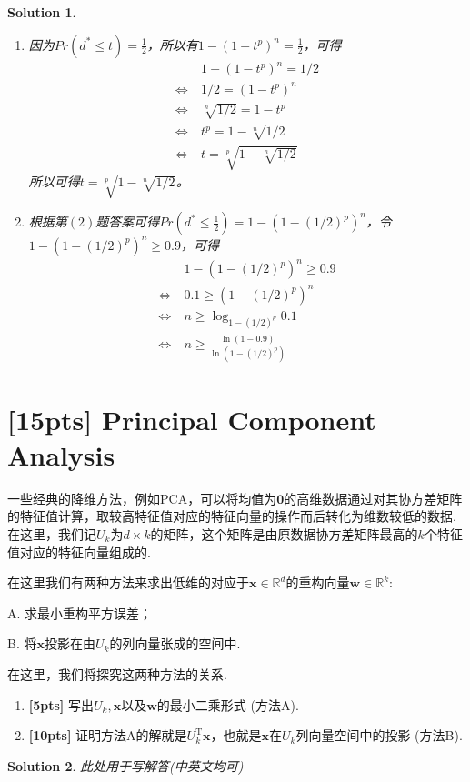 \documentclass[a4paper,UTF8]{article}
\numberwithin{equation}{section}
\newtheorem*{mySol}{Solution}
\begin{document}
\begin{mySol}
\begin{enumerate}[(1)]
\item 
因为$Pr(d^*\leq t)=\frac{1}{2}$，所以有$1 - (1-t^p)^n = \frac{1}{2}$，可得
\begin{equation}
\begin{aligned}
&1 - (1-t^p)^n = 1/2\\
\Leftrightarrow\ &1/2 = (1-t^p)^n\\
\Leftrightarrow\ &\sqrt[n]{1/2} = 1-t^p\\
\Leftrightarrow\ &t^p = 1- \sqrt[n]{1/2}\\
\Leftrightarrow\ &t = \sqrt[p]{1- \sqrt[n]{1/2}}
\end{aligned}
\end{equation}
所以可得$t = \sqrt[p]{1- \sqrt[n]{1/2}}$。
\item 
根据第$(2)$题答案可得$Pr(d^* \leq \frac{1}{2}) = 1 - (1-(1/2)^p)^n$，令$1 - (1-(1/2)^p)^n \geq 0.9$，可得
\begin{equation}
\begin{aligned}
&1 - (1-(1/2)^p)^n \geq 0.9\\
\Leftrightarrow\ &0.1 \geq (1-(1/2)^p)^n\\
\Leftrightarrow\ &n \geq \log_{1-(1/2)^p}0.1\\
\Leftrightarrow\ &n \geq \frac{\ln (1-0.9)}{\ln (1-(1/2)^p)}
\end{aligned}
\end{equation}
\end{enumerate}
\end{mySol}
\newpage

\section{[15pts] Principal Component Analysis}
一些经典的降维方法，例如PCA，可以将均值为$\mathbf{0}$的高维数据通过对其协方差矩阵的特征值计算，取较高特征值对应的特征向量的操作而后转化为维数较低的数据. 在这里，我们记$U_k$为$d\times k$的矩阵，这个矩阵是由原数据协方差矩阵最高的$k$个特征值对应的特征向量组成的. 

在这里我们有两种方法来求出低维的对应于$\mathbf{x}\in \mathbb{R}^d$的重构向量$\mathbf{w}\in \mathbb{R}^k$:

A. 求最小重构平方误差；

B. 将$\mathbf{x}$投影在由$U_k$的列向量张成的空间中.

在这里，我们将探究这两种方法的关系.
\begin{enumerate}[(1)]
\item \textbf{[5pts]} 写出$U_k, \mathbf{x}$以及$\mathbf{w}$的最小二乘形式 (方法A).
\item \textbf{[10pts]} 证明方法A的解就是$U_k^\mathrm{T}\mathbf{x}$，也就是$\mathbf{x}$在$U_k$列向量空间中的投影 (方法B).
\end{enumerate}
\begin{mySol}
	此处用于写解答(中英文均可)
	~\\
	~\\
	~\\
	~\\
	~\\
	~\\
	~\\
\end{mySol}
\end{document}

